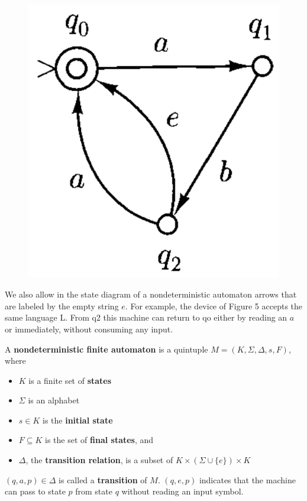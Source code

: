 \begin{figure}[ht!]
  \centering
  \includegraphics[width=.2\textwidth]{img/Fig2.6.png}
  \caption{}
\end{figure}

We also allow in the state diagram of a nondeterministic automaton arrows that are labeled by the empty string $e$. For example, the device of Figure 5 accepts the same language L. From q2 this machine can return to qo either by reading an $a$ or immediately, without consuming any input.

\begin{definition}{}
  A \textbf{nondeterministic finite automaton} is a quintuple $M = (K, \Sigma, \Delta, s, F)$, where
  \begin{itemize}
    \item $K$ is a finite set of \textbf{states}
    \item $\Sigma$ is an alphabet
    \item $s \in K$ is the \textbf{initial state}
    \item $F \subseteq K$ is the set of \textbf{final states}, and
    \item $\Delta$, the \textbf{transition relation}, is a subset of $K \times (\Sigma \cup \{e\}) \times K$ 
\end{itemize}
\end{definition}

$(q, a, p) \in \Delta$ is called a \textbf{transition} of $M$. $(q, e, p)$ indicates that the machine can pass to state $p$ from state $q$ without reading an input symbol.

